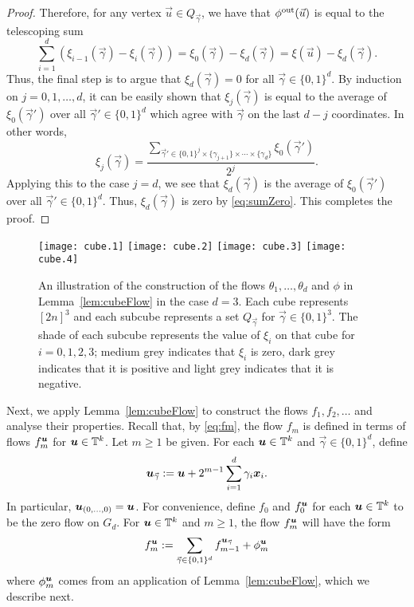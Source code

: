 \documentclass[12pt,a4paper]{amsart}
\numberwithin{equation}{section}
\theoremstyle{definition}
\begin{document}
\begin{proof}
Therefore, for any vertex $\vec{u}\in Q_{\vec{\gamma}}$, we have that $\phi^{\operatorname{out}}(\vec{u})$ is equal to the telescoping sum
\[\sum_{i=1}^d\left(\xi_{i-1}(\vec{\gamma}) - \xi_i(\vec{\gamma})\right) = \xi_0(\vec{\gamma}) - \xi_d(\vec{\gamma}) = \xi(\vec{u})-\xi_d(\vec{\gamma}).\]
Thus, the final step is to argue that $\xi_d(\vec{\gamma})=0$ for all $\vec{\gamma}\in\{0,1\}^d$. By induction on $j=0,1,\dots,d$, it can be easily shown that $\xi_j(\vec{\gamma})$ is equal to the average of $\xi_0(\vec{\gamma}')$ over all $\vec{\gamma}'\in\{0,1\}^d$ which agree with $\vec{\gamma}$ on the last $d-j$ coordinates. In other words,
\[\xi_j(\vec{\gamma}) = \frac{\sum_{\vec{\gamma}'\in\{0,1\}^j\times\{\gamma_{j+1}\}\times\cdots\times\{\gamma_d\}}\xi_0(\vec{\gamma}')}{2^j}.\]
Applying this to the case $j=d$, we see that $\xi_d(\vec{\gamma})$ is the average of $\xi_0(\vec{\gamma}')$ over all $\vec{\gamma}'\in\{0,1\}^d$. Thus, $\xi_d(\vec{\gamma})$ is zero by \eqref{eq:sumZero}. This completes the proof. 
\end{proof}



\begin{figure}[htbp]
\begin{center}
\texttt{[image: cube.1]}
\hspace{0.5cm}
\texttt{[image: cube.2]}
\hspace{0.5cm}
\texttt{[image: cube.3]}
\hspace{0.5cm}
\texttt{[image: cube.4]}
\end{center}
\caption{An illustration of the construction of the flows $\theta_1,\dots,\theta_d$ and $\phi$ in Lemma~\ref{lem:cubeFlow} in the case $d=3$. Each cube  represents $[2n]^3$ and each subcube represents a set $Q_{\vec{\gamma}}$ for $\vec{\gamma}\in\{0,1\}^3$. The shade of each subcube represents the value of $\xi_i$ on that cube for $i=0,1,2,3$; medium grey indicates that $\xi_i$ is zero, dark grey indicates that it is positive and light grey indicates that it is negative. }
\label{fig:cubes}
\end{figure}

Next, we apply Lemma~\ref{lem:cubeFlow} to construct the flows $f_1,f_2,\dots$ and analyse their properties. Recall that, by \eqref{eq:fm}, the flow $f_m$ is defined in terms of flows $f_m^{\boldsymbol{u}}$ for $\boldsymbol{u}\in\mathbb{T}^k$. Let $m\geq1$ be given. For each $\boldsymbol{u}\in \mathbb{T}^k$ and $\vec{\gamma}\in\{0,1\}^d$, define 
\[\boldsymbol{u}_{\vec{\gamma}}:=\boldsymbol{u}+2^{m-1}\sum_{i=1}^d\gamma_i\boldsymbol{x}_i.\]
In particular, $\boldsymbol{u}_{(0,\dots,0)}=\boldsymbol{u}$. For convenience, define $f_0$ and $f_0^{\boldsymbol{u}}$ for each $\boldsymbol{u}\in\mathbb{T}^k$ to be the zero flow on $G_d$. For $\boldsymbol{u}\in\mathbb{T}^k$ and $m\geq1$, the flow $f_m^{\boldsymbol{u}}$ will have the form
\begin{equation}
\label{eq:fmu}
f_m^{\boldsymbol{u}}:=\sum_{\vec{\gamma}\in\{0,1\}^d}f_{m-1}^{\boldsymbol{u}_{\vec{\gamma}}} + \phi_m^{\boldsymbol{u}}
\end{equation}
where $\phi_m^{\boldsymbol{u}}$ comes from an application of Lemma~\ref{lem:cubeFlow}, which we describe next. 
\end{document}

